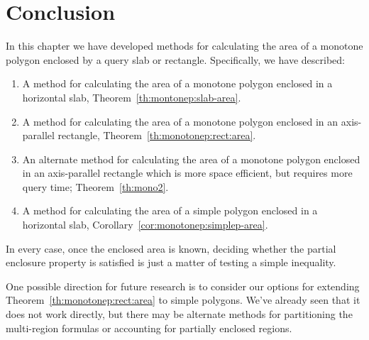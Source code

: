 \section{Conclusion}
\label{:monotonep:concl}

In this chapter we have developed methods for calculating the area of a monotone polygon enclosed by a query slab or rectangle.  Specifically, we have described:

\begin{enumerate}
\item A method for calculating the area of a monotone polygon enclosed in a horizontal slab, Theorem~\ref{th:montonep:slab-area}.

\item A method for calculating the area of a monotone polygon enclosed in an axis-parallel rectangle, Theorem~\ref{th:monotonep:rect:area}.

\item An alternate method for calculating the area of a monotone polygon enclosed in an axis-parallel rectangle which is more space efficient, but requires more query time; Theorem~\ref{th:mono2}.

\item A method for calculating the area of a simple polygon enclosed in a horizontal slab, Corollary~\ref{cor:monotonep:simplep-area}.

\end{enumerate}

In every case, once the enclosed area is known, deciding whether the partial enclosure property is satisfied is just a matter of testing a simple inequality.

One possible direction for future research is to consider our options for extending Theorem~\ref{th:monotonep:rect:area} to simple polygons. 
We've already seen that it does not work directly, but there may be alternate methods for partitioning the multi-region formulas or accounting for partially enclosed regions.

